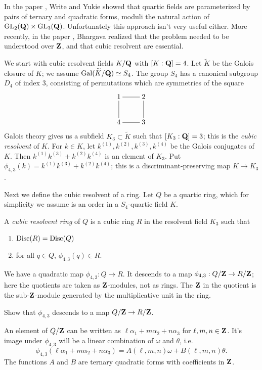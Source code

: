 In the paper \cite{wy92}, Write and Yukie showed that quartic fields are 
parameterized by pairs of ternary and quadratic forms, moduli the natural 
action of $\operatorname{GL}_2(\mathbf{Q})\times \operatorname{GL}_3(\mathbf{Q})$. Unfortunately 
this approach isn't very useful either. More recently, in the paper 
\cite{b04}, Bhargava realized that the problem needed to be understood over 
$\mathbf{Z}$, and that  cubic resolvent are essential. 

We start with cubic resolvent fields $K/\mathbf{Q}$ with $[K:\mathbf{Q}]=4$. Let 
$\widetilde K$ be the Galois closure of $K$; we assume 
$\operatorname{Gal}(\widetilde K/\mathbf{Q})\simeq S_4$. The group $S_4$ has a canonical 
subgroup $D_4$ of index $3$, consisting of permutations which are 
symmetries of the square 
\[\xymatrix{
  1 \ar@{-}[r] \ar@{-}[d] 
    & 2 \ar@{-}[d] \\
  4 \ar@{-}[r] 
    & 3
}\]
Galois theory gives us a subfield $K_3\subset \widetilde K$ such that 
$[K_3:\mathbf{Q}]=3$; this is the \emph{cubic resolvent} of $K$. For 
$k\in K$, let $k^{(1)},k^{(2)},k^{(3)},k^{(4)}$ be the Galois conjugates of 
$K$. Then $k^{(1)} k^{(3)} + k^{(2)} k^{(4)}$ is an element of $K_3$. Put 
$\phi_{4,3}(k) = k^{(1)} k^{(3)} + k^{(2)} k^{(4)}$; this is a 
discriminant-preserving map $K\to K_3$. 

Next we define the cubic resolvent of a ring. Let $Q$ be a quartic ring, which 
for simplicity we assume is an order in a $S_4$-quartic field $K$. 

\begin{defi}
A \emph{cubic resolvent ring} of $Q$ is a cubic ring $R$ in the resolvent 
field $K_3$ such that 
\begin{enumerate}
  \item $\operatorname{Disc}(R)=\operatorname{Disc}(Q)$
  \item for all $q\in Q$, $\phi_{4,3}(q)\in R$. 
\end{enumerate}
\end{defi}
We have a quadratic map $\phi_{4,3}:Q\to R$. It descends to a map 
$\phi_{4,3}:Q/\mathbf{Z} \to R/\mathbf{Z}$; here the quotients are taken as 
$\mathbf{Z}$-modules, not as rings. The $\mathbf{Z}$ in the quotient is the 
sub-$\mathbf{Z}$-module generated by the multiplicative unit in the ring. 

\begin{exercise}
Show that $\phi_{4,3}$ descends to a map $Q/\mathbf{Z}\to R/\mathbf{Z}$. 
\end{exercise}

An element of $Q/\mathbf{Z}$ can be written as $\ell\alpha_1+m \alpha_2 + n \alpha_3$ 
for $\ell,m,n\in \mathbf{Z}$. It's image under $\phi_{4,3}$ will be a linear combination 
of $\omega$ and $\theta$, i.e. 
\[
  \phi_{4,3}(\ell \alpha_1 + m\alpha_2 + n\alpha_3) = A(\ell,m,n) \omega + B(\ell,m,n)\theta .
\]
The functions $A$ and $B$ are ternary quadratic forms with coefficients in 
$\mathbf{Z}$. 


